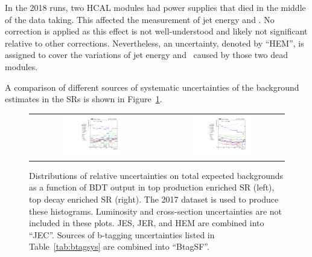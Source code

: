 In the 2018 runs, two HCAL modules had power supplies that died in the middle of the data taking. This affected the measurement of jet energy and \MET. No correction is applied as this effect is not well-understood and likely not significant relative to other corrections. Nevertheless, an uncertainty, denoted by ``HEM'', is assigned to cover the variations of jet energy and \MET~caused by those two dead modules. 

A comparison of different sources of systematic uncertainties of the background estimates in the \acp{SR} is shown in Figure~\ref{fig:Comp_sys_background}.

\begin{figure}[tbh!]
 \begin{center}
 \begin{tabular}{cc}
 \includegraphics[width=0.48\textwidth]{figures/Part3/Systematics/sysBDT_ST_bkg_2017}&
 \includegraphics[width=0.48\textwidth]{figures/Part3/Systematics/sysBDT_TT_bkg_2017} \\
 \end{tabular}
 \caption{Distributions of relative uncertainties on total expected backgrounds as a function of \ac{BDT} output in top production enriched \ac{SR} (left), top decay enriched \ac{SR} (right). The 2017 dataset is used to produce these histograms. Luminosity and cross-section uncertainties are not included in these plots. \ac{JES}, \ac{JER}, and HEM are combined into ``JEC''. Sources of b-tagging uncertainties listed in Table~\ref{tab:btagsys} are combined into ``BtagSF''.}
 \label{fig:Comp_sys_background}
 \end{center}
\end{figure}

